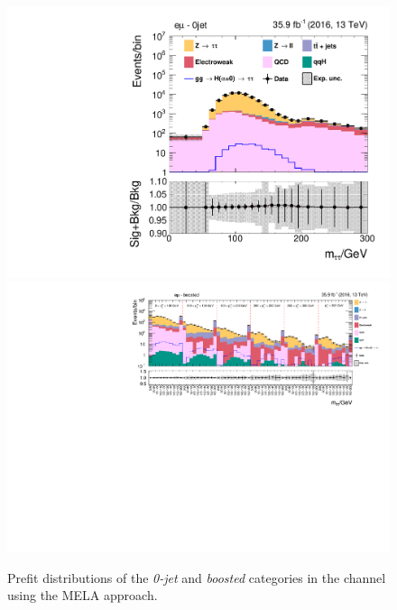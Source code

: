 \begin{figure}[h!]
    \centering
        \includegraphics[width=.5\textwidth]{Figures/statana/Postfit_JEC_mela3D/prefit_htt_em_1_13TeV.pdf}\\
        \includegraphics[width=\textwidth]{Figures/statana/Postfit_JEC_mela3D/prefit_htt_em_2_13TeV.pdf}
    \caption{Prefit distributions of the \textit{0-jet} and \textit{boosted} categories in the \emu{} channel  using the MELA approach.}
\end{figure} 
